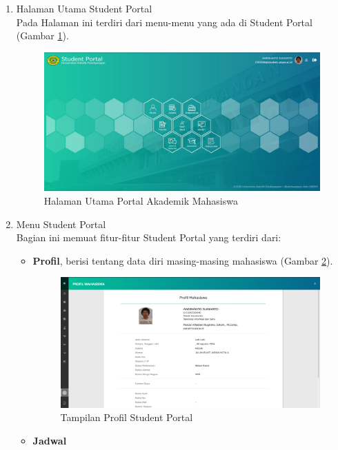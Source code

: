 \begin{enumerate}
	\item Halaman Utama Student Portal \\
	Pada Halaman ini terdiri dari menu-menu yang ada di Student Portal (Gambar \ref{fig:studentportal_home}).
	\begin{figure}[H]
		\centering
		\includegraphics[scale=0.3]{Gambar/studentportal_home}
		\caption{Halaman Utama Portal Akademik Mahasiswa}
		\label{fig:studentportal_home}
	\end{figure}
	\item Menu Student Portal \\
	Bagian ini memuat fitur-fitur Student Portal yang terdiri dari:
	\begin{itemize}
		\item \textbf{Profil}, berisi tentang data diri masing-masing mahasiswa (Gambar \ref{fig:studentportal_profil}).
		\begin{figure}[H]
		\centering
		\includegraphics[scale=0.3]{Gambar/studentportal_profil}
		\caption{Tampilan Profil Student Portal}
		\label{fig:studentportal_profil}
		\end{figure}
		\item \textbf{Jadwal} \\

\end{itemize}
\end{enumerate}
